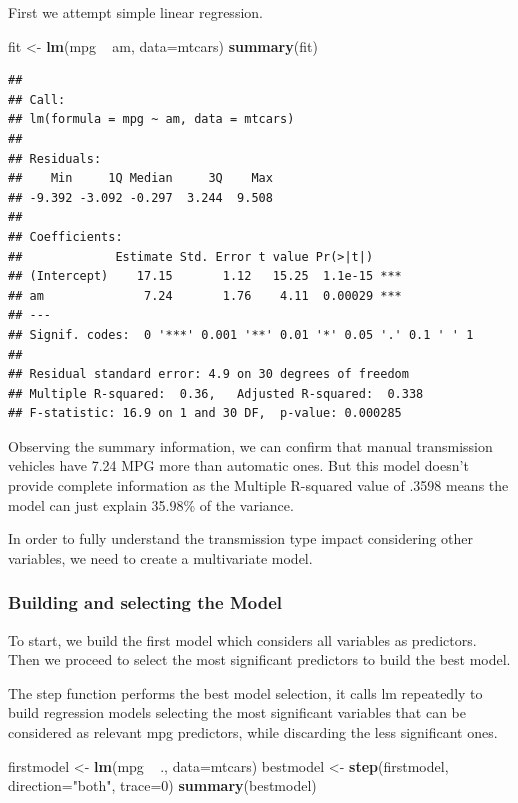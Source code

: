\documentclass[]{article}
\newenvironment{Shaded}{\begin{snugshade}}{\end{snugshade}}
\newcommand{\KeywordTok}[1]{\textcolor[rgb]{0.13,0.29,0.53}{\textbf{{#1}}}}
\newcommand{\DataTypeTok}[1]{\textcolor[rgb]{0.13,0.29,0.53}{{#1}}}
\newcommand{\DecValTok}[1]{\textcolor[rgb]{0.00,0.00,0.81}{{#1}}}
\newcommand{\StringTok}[1]{\textcolor[rgb]{0.31,0.60,0.02}{{#1}}}
\newcommand{\NormalTok}[1]{{#1}}
\begin{document}
First we attempt simple linear regression.

\begin{Shaded}
\begin{Highlighting}[]
\NormalTok{fit <-}\StringTok{ }\KeywordTok{lm}\NormalTok{(mpg ~}\StringTok{ }\NormalTok{am, }\DataTypeTok{data=}\NormalTok{mtcars)}
\KeywordTok{summary}\NormalTok{(fit)}
\end{Highlighting}
\end{Shaded}

\begin{verbatim}
## 
## Call:
## lm(formula = mpg ~ am, data = mtcars)
## 
## Residuals:
##    Min     1Q Median     3Q    Max 
## -9.392 -3.092 -0.297  3.244  9.508 
## 
## Coefficients:
##             Estimate Std. Error t value Pr(>|t|)    
## (Intercept)    17.15       1.12   15.25  1.1e-15 ***
## am              7.24       1.76    4.11  0.00029 ***
## ---
## Signif. codes:  0 '***' 0.001 '**' 0.01 '*' 0.05 '.' 0.1 ' ' 1
## 
## Residual standard error: 4.9 on 30 degrees of freedom
## Multiple R-squared:  0.36,   Adjusted R-squared:  0.338 
## F-statistic: 16.9 on 1 and 30 DF,  p-value: 0.000285
\end{verbatim}

Observing the summary information, we can confirm that manual
transmission vehicles have 7.24 MPG more than automatic ones. But this
model doesn't provide complete information as the Multiple R-squared
value of .3598 means the model can just explain 35.98\% of the variance.

In order to fully understand the transmission type impact considering
other variables, we need to create a multivariate model.

\subsubsection{Building and selecting the
Model}\label{building-and-selecting-the-model}

To start, we build the first model which considers all variables as
predictors. Then we proceed to select the most significant predictors to
build the best model.

The step function performs the best model selection, it calls lm
repeatedly to build regression models selecting the most significant
variables that can be considered as relevant mpg predictors, while
discarding the less significant ones.

\begin{Shaded}
\begin{Highlighting}[]
\NormalTok{firstmodel <-}\StringTok{ }\KeywordTok{lm}\NormalTok{(mpg ~}\StringTok{ }\NormalTok{., }\DataTypeTok{data=}\NormalTok{mtcars)}
\NormalTok{bestmodel <-}\StringTok{ }\KeywordTok{step}\NormalTok{(firstmodel, }\DataTypeTok{direction=}\StringTok{"both"}\NormalTok{, }\DataTypeTok{trace=}\DecValTok{0}\NormalTok{)}
\KeywordTok{summary}\NormalTok{(bestmodel)}
\end{Highlighting}
\end{Shaded}
\end{document}
